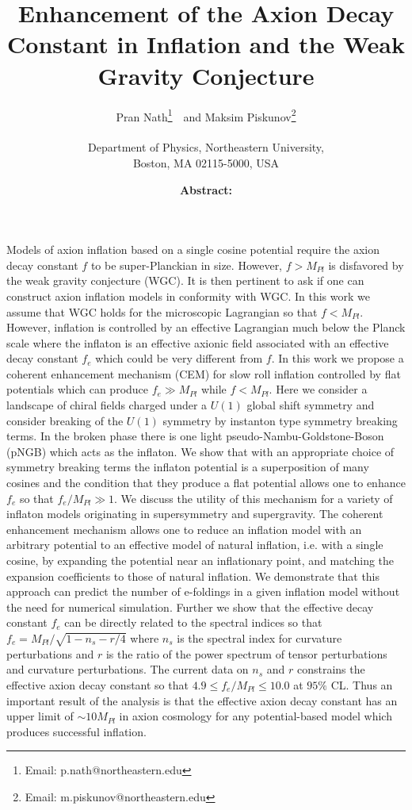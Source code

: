 \documentclass[12pt]{article}
\author{
  Pran Nath\footnote{Email: p.nath@northeastern.edu}~\ and
  Maksim Piskunov\footnote{Email: m.piskunov@northeastern.edu}\\~\\
  Department of Physics, Northeastern University,\\
  Boston, MA 02115-5000, USA
}
\title{
  Enhancement 
   of the Axion Decay Constant in Inflation and the Weak Gravity Conjecture
}
\begin{document}
\maketitle
\date

\textbf{Abstract:}
Models of axion inflation based on a single cosine potential require the axion decay constant $f$ to be super-Planckian in size.
However, $f > M_{Pl}$ is disfavored by the weak gravity conjecture (WGC).
It is then pertinent to ask if one can construct axion inflation models in conformity with WGC.
In this work we assume that WGC holds for the microscopic Lagrangian so that $f < M_{Pl}$.
However, inflation is controlled by an effective Lagrangian much below the Planck scale where the inflaton is an effective axionic field associated with an effective decay constant $f_e$ which could be very different from $f$.
In this work we propose a coherent enhancement mechanism (CEM) for slow roll inflation controlled by flat potentials which can produce $f_e \gg M_{Pl}$ while $f < M_{Pl}$.
Here we consider a landscape of chiral fields charged under a $U\left(1\right)$ global shift symmetry and consider breaking of the $U\left(1\right)$ symmetry by instanton type symmetry breaking terms.
In the broken phase there is one light pseudo-Nambu-Goldstone-Boson (pNGB) which acts as the inflaton.
We show that with an appropriate choice of symmetry breaking terms the inflaton potential is a superposition of many cosines and the condition that they produce a flat potential allows one to enhance $f_e$ so that $f_e / M_{Pl} \gg 1$.
We discuss the utility of this mechanism for a variety of inflaton models originating in supersymmetry and supergravity.
The coherent enhancement mechanism allows one to reduce an inflation model with an arbitrary potential to an effective model of natural inflation, i.e. with a single cosine, by expanding the potential near an inflationary point, and matching the expansion coefficients to those of natural inflation.
We demonstrate that this approach can predict the number of e-foldings in a given inflation model without the need for numerical simulation.
Further we show that the effective decay constant $f_e$ can be directly related to the spectral indices so that $f_e = M_{Pl} / \sqrt{1 - n_s - r / 4}$ where $n_s$ is the spectral index for curvature perturbations and $r$ is the ratio of the power spectrum of tensor perturbations and curvature perturbations.
The current data on $n_s$ and $r$ constrains the effective axion decay constant so that $4.9 \leq f_e / M_{Pl} \leq 10.0$ at $95\%$ CL.
Thus an important result of the analysis is that the effective axion decay constant has an upper limit of $\sim 10 M_{Pl}$ in axion cosmology for any potential-based model which produces successful inflation.
\end{document}
